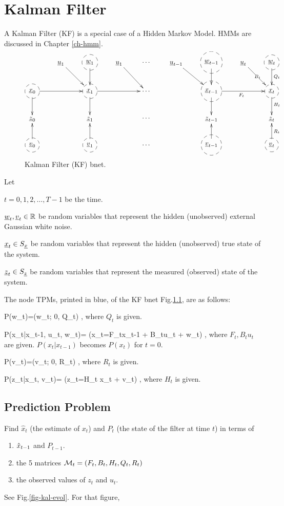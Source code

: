 \chapter{Kalman Filter}\label{ch-kalman}

A Kalman Filter (KF) is a special case of a
Hidden Markov Model. HMMs are
 discussed in Chapter \ref{ch-hmm}.

\begin{figure}[h!]
\centering
$$\xymatrix{
&\rvu_1\ar[dr]
&*++[F-o]{\rvw_1}\ar[d]
&\rvu_1\ar[dr]
&\cdots
&\rvu_{t-1}\ar[dr]
&*++[F-o]{\rvw_{t-1}}\ar[d]
&\rvu_t\ar[dr]|{B_t}
&*++[F-o]{\rvw_{t}}\ar[d]^{Q_t}
\\
*++[F-o]{\rvx_0}\ar[d]\ar[rr]
&&*++[F-o]{\rvx_1}\ar[d]\ar[rr]
&&\cdots
&&*++[F-o]{\rvx_{t-1}}\ar[d]\ar[rr]_{F_t}
&&*++[F-o]{\rvx_{t}}\ar[d]^{H_t}
\\
\rvz_0
&&\rvz_1
&&\cdots
&&\rvz_{t-1}
&
&\rvz_{t}
\\
*++[F-o]{\rvv_0}\ar[u]
&&*++[F-o]{\rvv_1}\ar[u]
&&\cdots
&&*++[F-o]{\rvv_{t-1}}\ar[u]
&&*++[F-o]{\rvv_{t}}\ar[u]_{R_t}
}$$
\caption{Kalman Filter (KF) bnet.}
\label{fig-kal}
\end{figure}

Let 

$t=0, 1, 2, \dots , T-1$ be the time.

${\underline{w}}_t, {\underline{v}}_t\in { \mathbb{R}}$ be
random variables that represent
the hidden (unobserved)   external
Gaussian white noise.

${\underline{x}}_t\in S_{\underline{x}}$ be
random variables that represent
the hidden (unobserved) true
state of the system.

${\underline{z}}_t\in S_{\underline{z}}$ be
random variables that represent
the measured (observed) state of the system.


The 
node TPMs,
printed in blue,
of the KF bnet Fig.\ref{fig-kal},
are as follows:

\beq\color{blue}
P(w_t)=\caln(w_t; 0, Q_t)
\;,
\eeq
where $Q_t$ is given.


\beq\color{blue}
P(x_t|x_{t-1}, u_t, w_t)=
\indi(x_t=F_tx_{t-1} + B_tu_t + w_t)
\;,
\eeq
where $F_t, B_tu_t$
are given. $P(x_t|x_{t-1})$ becomes $P(x_t)$
for $t=0$.

\beq\color{blue}
P(v_t)=\caln(v_t; 0, R_t)
\;,
\eeq
where $R_t$ is given.

\beq\color{blue}
P(z_t|x_t, v_t)=
\indi(z_t=H_t x_t +  v_t)
\;,
\eeq
where $H_t$ is given.


\section{Prediction
Problem}
Find $\hat{x}_t$ (the estimate
of $x_t$)
and $P_t$ (the state of the 
filter at time $t$)
in terms of 
\begin{enumerate}
\item
${\hat{x}}_{t-1}$
and $P_{t-1}$.
\item
 the 5 matrices
${\cal M}_t=(F_t,B_t,H_t,Q_t,R_t)$
\item
the observed  values of 
$z_t$ and $u_t$.

\end{enumerate}
See Fig.\ref{fig-kal-evol}.
For that figure,

